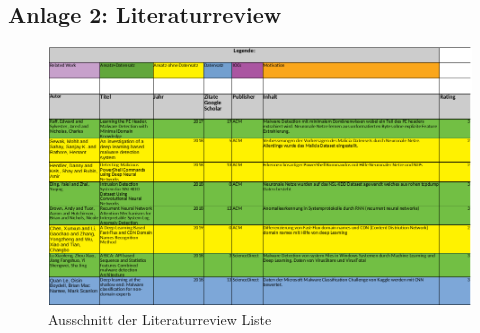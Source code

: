 \documentclass[
    12pt, %
    DIV10,
    ngerman, %
    a4paper, %
    oneside, %
    titlepage, %
    parskip=half, %
    headings=normal, %
    listof=totoc, %
    bibliography=totoc, %
    index=totoc, %
    captions=tableheading, %
    final %
]{scrreprt}
\begin{document}
\subsection*{Anlage 2: Literaturreview}\label{literaturr}

\begin{figure}[h!]
\hspace{-2.2cm}
\includegraphics[width=1.3\textwidth]{img/literaturr}
\caption*{Ausschnitt der Literaturreview Liste}
\end{figure}
\listoftodos
\end{document}
